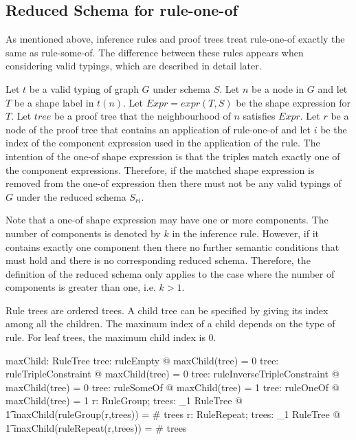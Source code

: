 \documentclass{article}
\begin{document}
\subsection{Reduced Schema for rule-one-of}
As mentioned above, inference rules and proof trees treat rule-one-of exactly the same as rule-some-of.
The difference between these rules appears when considering valid typings, which are described in detail later.

Let $t$ be a valid typing of graph $G$ under schema $S$.
Let $n$ be a node in $G$ and let $T$ be a shape label in $t(n)$.
Let $Expr = expr(T,S)$ be the shape expression for $T$.
Let $tree$ be a proof tree that the neighbourhood of $n$ satisfies $Expr$.
Let $r$ be a node of the proof tree that contains an application of rule-one-of
and let $i$ be the index of the component expression used in the application of the rule.
The intention of the one-of shape expression is that the triples match exactly one of the component expressions.
Therefore, if the matched shape expression is removed from the one-of expression then there must not be any valid typings
of $G$ under the reduced schema $S_{ri}$.

Note that a one-of shape expression may have one or more components.
The number of components is denoted by $k$ in the inference rule.
However, if it contains exactly one component then there no further semantic conditions that must hold and there
is no corresponding reduced schema.
Therefore, the definition of the reduced schema only applies to the case where the number of components is greater than one,
i.e. $k > 1$.

Rule trees are ordered trees.
A child tree can be specified by giving its index among all the children.
The maximum index of a child depends on the type of rule.
For leaf trees, the maximum child index is 0.
\begin{axdef}
	maxChild: RuleTree \fun \nat
\where
	\forall tree: \ran ruleEmpty @ maxChild(tree) = 0
\also
	\forall tree: \ran ruleTripleConstraint @ maxChild(tree) = 0
\also
	\forall tree: \ran ruleInverseTripleConstraint @ maxChild(tree) = 0
\also
	\forall tree: \ran ruleSomeOf @ maxChild(tree) = 1
\also
	\forall tree: \ran ruleOneOf @ maxChild(tree) = 1
\also
	\forall r: RuleGroup; trees: \seq_1 RuleTree @ \\
\t1		maxChild(ruleGroup(r,trees)) = \# trees
\also
	\forall r: RuleRepeat; trees: \seq_1 RuleTree @ \\
\t1		maxChild(ruleRepeat(r,trees)) = \# trees
\end{axdef}
\end{document}
